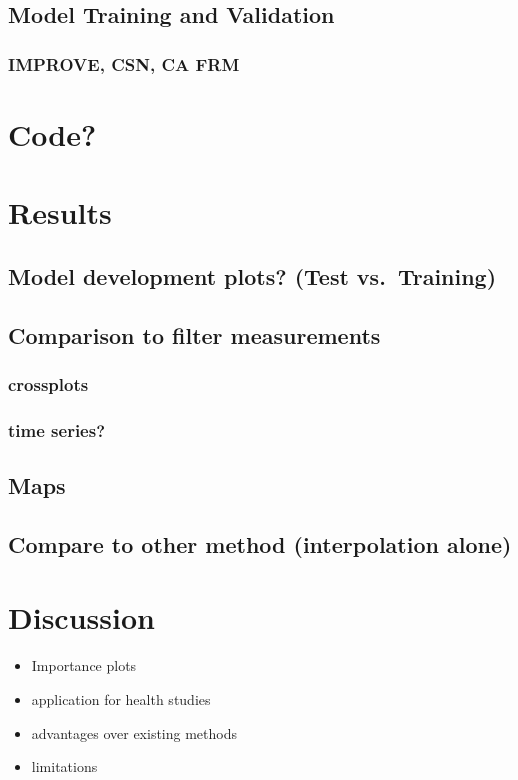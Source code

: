 \documentclass[gmd, manuscript]{copernicus}
\providecommand{\tightlist}{%
  \setlength{\itemsep}{0pt}\setlength{\parskip}{0pt}}
\begin{document}
\subsection{Model Training and Validation}

\subsubsection{IMPROVE, CSN, CA FRM}

\section{Code?}

\section{Results}

\subsection{Model development plots? (Test vs.~Training)}

\subsection{Comparison to filter measurements}

\subsubsection{crossplots}

\subsubsection{time series?}

\subsection{Maps}

\subsection{Compare to other method (interpolation alone)}

\section{Discussion}

\begin{itemize}
\tightlist
\item
  Importance plots
\item
  application for health studies
\item
  advantages over existing methods
\item
  limitations
\end{itemize}
\end{document}
